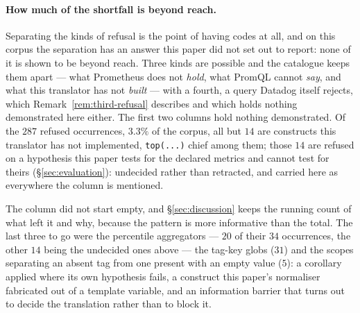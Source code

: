 \paragraph{How much of the shortfall is beyond reach.}
Separating the kinds of refusal is the point of having codes at all, and on this corpus
the separation has an answer this paper did not set out to report: none of it is shown
to be beyond reach. Three kinds are possible and the catalogue keeps them apart --- what
Prometheus does not \emph{hold}, what PromQL cannot \emph{say}, and what this translator
has not \emph{built} --- with a fourth, a query Datadog itself rejects, which
Remark~\ref{rem:third-refusal} describes and which holds nothing demonstrated here
either. The first two columns hold nothing demonstrated. Of the $287$ refused
occurrences, $3.3\%$ of the corpus, all but $14$ are constructs this translator has not
implemented, \texttt{top(...)} chief among them; those $14$ are refused on a hypothesis
this paper tests for the declared metrics and cannot test for theirs
(\S\ref{sec:evaluation}): undecided rather than retracted, and carried here as
everywhere the column is mentioned.

The column did not start empty, and \S\ref{sec:discussion} keeps the running count of
what left it and why, because the pattern is more informative than the total. The last
three to go were the percentile aggregators --- $20$ of their $34$ occurrences, the
other $14$ being the undecided ones above --- the tag-key globs ($31$) and the
scopes separating an absent tag from one present with an empty value ($5$): a corollary
applied where its own hypothesis fails, a construct this paper's normaliser fabricated
out of a template variable, and an information barrier that turns out to decide the
translation rather than to block it.

